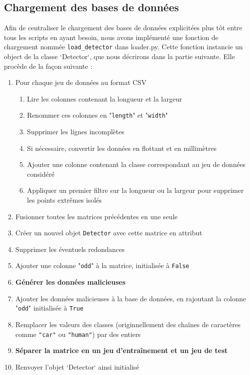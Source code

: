 \documentclass[a4paper]{report}
\begin{document}
\subsection{Chargement des bases de données}

Afin de centraliser le chargement des bases de données explicitées plus tôt entre tous les scripts en ayant besoin, nous avons implémenté une fonction de chargement nommée \texttt{load\_detector} dans loader.py. Cette fonction instancie un object de la classe `Detector`, que nous décrirons dans la partie suivante. Elle procède de la façon suivante :

\begin{enumerate}
\item Pour chaque jeu de données au format CSV
\begin{enumerate}[{1.}1.]
\item Lire les colonnes contenant la longueur et la largeur
\item Renommer ces colonnes en "\texttt{length}" et "\texttt{width}"
\item Supprimer les lignes incomplètes
\item Si nécessaire, convertir les données en flottant et en millimètres
\item Ajouter une colonne contenant la classe correspondant au jeu de données considéré
\item Appliquer un premier filtre sur la longueur ou la largeur pour supprimer les points extrêmes isolés
\end{enumerate}
\item Fusionner toutes les matrices précédentes en une seule
\item Créer un nouvel objet \texttt{Detector} avec cette matrice en attribut
\item Supprimer les éventuels redondances
\item Ajouter une colonne "\texttt{odd}" à la matrice, initialisée à \texttt{False}
\item \textbf{Générer les données malicieuses}
\item Ajouter les données malicieuses à la base de données, en rajoutant la colonne "\texttt{odd}" initialisée à \texttt{True}
\item Remplacer les valeurs des classes (originnellement des chaînes de caractères comme \texttt{"car"} ou \texttt{"human"}) par des entiers
\item \textbf{Séparer la matrice en un jeu d'entraînement et un jeu de test}
\item Renvoyer l'objet `Detector` ainsi initialisé
\end{enumerate}
\end{document}

